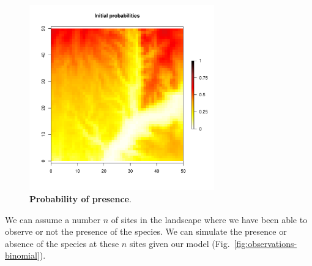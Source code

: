 \documentclass[a4paper, 12pt, leqno]{article}\usepackage[]{graphicx}\usepackage[]{color}
\begin{document}
\begin{figure} 
  \centering \includegraphics[width=8cm]{figures/theta-binomial.pdf}
  \caption{\textbf{Probability of presence}.}
  \label{fig:theta-binomial}
\end{figure}

We can assume a number $n$ of sites in the landscape where we have been able to observe
or not the presence of the species. We can simulate the presence or absence of the species
at these $n$ sites given our model (Fig.~\ref{fig:observations-binomial}).
\end{document}
